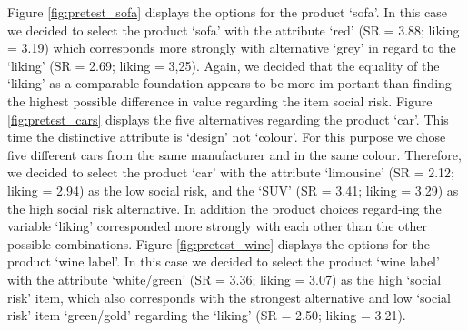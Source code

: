 Figure \ref{fig:pretest_sofa} displays the options for the product ‘sofa’. In this case we decided to select the product ‘sofa’ with the attribute ‘red’ (SR = 3.88; liking = 3.19) which corresponds more strongly with alternative ‘grey’ in regard to the ‘liking’ (SR = 2.69; liking = 3,25). Again, we decided that the equality of the ‘liking’ as a comparable foundation appears to be more im-portant than finding the highest possible difference in value regarding the item social risk. 
Figure \ref{fig:pretest_cars} displays the five alternatives regarding the product ‘car’. This time the distinctive attribute is ‘design’ not ‘colour’. For this purpose we chose five different cars from the same manufacturer and in the same colour. Therefore, we decided to select the product ‘car’ with the attribute ‘limousine’ (SR = 2.12; liking = 2.94) as the low social risk, and the ‘SUV’ (SR =  3.41; liking = 3.29) as the high social risk alternative. In addition the product choices regard-ing the variable ‘liking’ corresponded more strongly with each other than the other possible combinations.
Figure \ref{fig:pretest_wine} displays the options for the product ‘wine label’. In this case we decided to select the product ‘wine label’ with the attribute ‘white/green’ (SR = 3.36; liking = 3.07) as the high ‘social risk’ item, which also corresponds with the strongest alternative and low ‘social risk’ item ‘green/gold’ regarding the ‘liking’ (SR =  2.50; liking = 3.21). 


